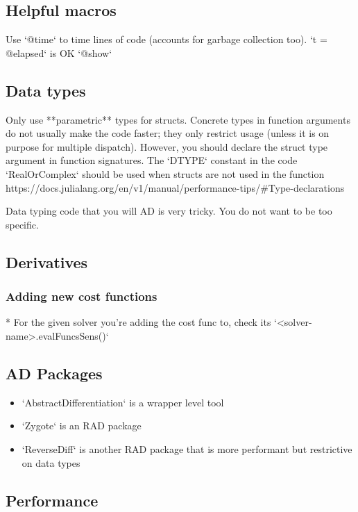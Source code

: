 \documentclass[10pt]{article}
\begin{document}
\subsection{Helpful macros}
Use `@time` to time lines of code (accounts for garbage collection too).
`t = @elapsed` is OK
`@show`

\subsection{Data types}

Only use **parametric** types for structs.
Concrete types in function arguments do not usually make the code faster; they only restrict usage (unless it is on purpose for multiple dispatch).
However, you should declare the struct type argument in function signatures.
The `DTYPE` constant in the code `RealOrComplex` should be used when structs are not used in the function
https://docs.julialang.org/en/v1/manual/performance-tips/\#Type-declarations

Data typing code that you will AD is very tricky.
You do not want to be too specific.

\subsection{Derivatives}

\subsubsection{Adding new cost functions}

* For the given solver you're adding the cost func to, check its `<solver-name>.evalFuncsSens()`

\subsection{AD Packages}

\begin{itemize}
	\item `AbstractDifferentiation` is a wrapper level tool
	\item `Zygote` is an RAD package
	\item `ReverseDiff` is another RAD package that is more performant but restrictive on data types
\end{itemize}

\subsection{Performance}
\end{document}
